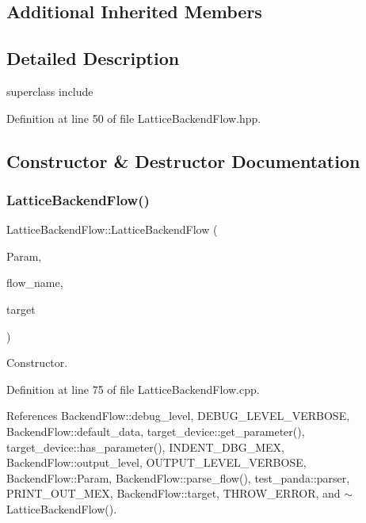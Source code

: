 \subsection*{Additional Inherited Members}


\subsection{Detailed Description}
superclass include 

Definition at line 50 of file Lattice\+Backend\+Flow.\+hpp.



\subsection{Constructor \& Destructor Documentation}
\mbox{\label{classLatticeBackendFlow_aa76f249f857e30947adab351737266c9}} 
\subsubsection{\texorpdfstring{Lattice\+Backend\+Flow()}{LatticeBackendFlow()}}
{\footnotesize\ttfamily Lattice\+Backend\+Flow\+::\+Lattice\+Backend\+Flow (\begin{DoxyParamCaption}\item[{const \hyperlink{Parameter_8hpp_a37841774a6fcb479b597fdf8955eb4ea}{Parameter\+Const\+Ref}}]{Param,  }\item[{const std\+::string \&}]{flow\+\_\+name,  }\item[{const \hyperlink{target__manager_8hpp_aee0b586a84fb6eb4faefa6e41e1735a9}{target\+\_\+manager\+Ref}}]{target }\end{DoxyParamCaption})}



Constructor. 



Definition at line 75 of file Lattice\+Backend\+Flow.\+cpp.



References Backend\+Flow\+::debug\+\_\+level, D\+E\+B\+U\+G\+\_\+\+L\+E\+V\+E\+L\+\_\+\+V\+E\+R\+B\+O\+SE, Backend\+Flow\+::default\+\_\+data, target\+\_\+device\+::get\+\_\+parameter(), target\+\_\+device\+::has\+\_\+parameter(), I\+N\+D\+E\+N\+T\+\_\+\+D\+B\+G\+\_\+\+M\+EX, Backend\+Flow\+::output\+\_\+level, O\+U\+T\+P\+U\+T\+\_\+\+L\+E\+V\+E\+L\+\_\+\+V\+E\+R\+B\+O\+SE, Backend\+Flow\+::\+Param, Backend\+Flow\+::parse\+\_\+flow(), test\+\_\+panda\+::parser, P\+R\+I\+N\+T\+\_\+\+O\+U\+T\+\_\+\+M\+EX, Backend\+Flow\+::target, T\+H\+R\+O\+W\+\_\+\+E\+R\+R\+OR, and $\sim$\+Lattice\+Backend\+Flow().

